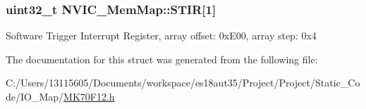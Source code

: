\subsubsection[{S\+T\+I\+R}]{\setlength{\rightskip}{0pt plus 5cm}uint32\+\_\+t N\+V\+I\+C\+\_\+\+Mem\+Map\+::\+S\+T\+I\+R\mbox{[}1\mbox{]}}\label{struct_n_v_i_c___mem_map_a417658a729224de65052153f5c2cc419}
Software Trigger Interrupt Register, array offset\+: 0x\+E00, array step\+: 0x4 

The documentation for this struct was generated from the following file\+:\begin{DoxyCompactItemize}
\item 
C\+:/\+Users/13115605/\+Documents/workspace/es18aut35/\+Project/\+Project/\+Static\+\_\+\+Code/\+I\+O\+\_\+\+Map/\hyperlink{_m_k70_f12_8h}{M\+K70\+F12.\+h}\end{DoxyCompactItemize}
